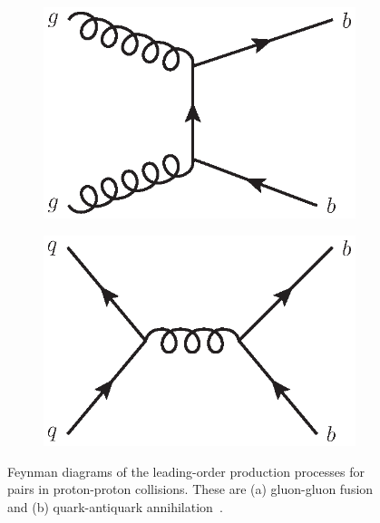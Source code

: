 \begin{figure}[!tb]
\centering
\begin{subfigure}{0.4\textwidth}
\includegraphics[width=\linewidth]{figs/detector/gluon_fusion.eps}
\caption{}
\label{fig:b-production:a}
\end{subfigure}
\begin{subfigure}{0.4\textwidth}
\includegraphics[width=\linewidth]{figs/detector/quark_antiquark_annihilation.eps}
\caption{}
\label{fig:b-production:b}
\end{subfigure}
\caption{Feynman diagrams of the leading-order production processes for \bquark\bquarkbar pairs in proton-proton collisions. These are (a) gluon-gluon fusion and (b) quark-antiquark annihilation~\cite{b-production}.}
\label{fig:b-production}
\end{figure}

